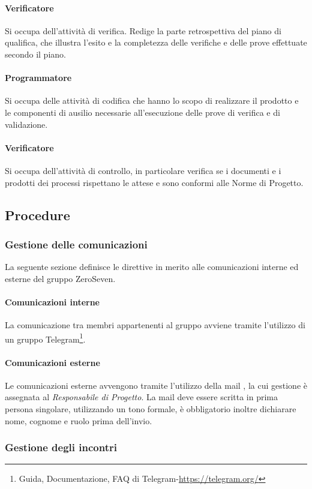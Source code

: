\paragraph{Verificatore} Si occupa dell'attività di verifica. Redige la parte retrospettiva del piano di qualifica, che illustra l'esito e la completezza delle verifiche e delle prove effettuate secondo il piano. 
\paragraph{Programmatore} Si occupa delle attività di codifica che hanno lo scopo di realizzare il prodotto e le componenti di ausilio necessarie all'esecuzione delle prove di verifica e di validazione. 
\paragraph{Verificatore} Si occupa dell'attività di controllo, in particolare verifica se i documenti e i prodotti dei processi rispettano le attese e sono conformi alle Norme di Progetto.
\subsection{Procedure}
\subsubsection{Gestione delle comunicazioni}
La seguente sezione definisce le direttive in merito alle comunicazioni interne ed esterne del gruppo ZeroSeven.
\paragraph{Comunicazioni interne}
La comunicazione tra membri appartenenti al gruppo avviene tramite l'utilizzo di un gruppo Telegram\footnote{Guida, Documentazione, FAQ di Telegram-\url{https://telegram.org/}}.
\paragraph{Comunicazioni esterne}
Le comunicazioni esterne avvengono tramite l'utilizzo della mail \mailzeroseven, la cui gestione è assegnata al \textit{Responsabile di Progetto}.
La mail deve essere scritta in prima persona singolare, utilizzando un tono formale, è obbligatorio inoltre dichiarare nome, cognome e ruolo prima dell'invio.
\subsubsection{Gestione degli incontri}
